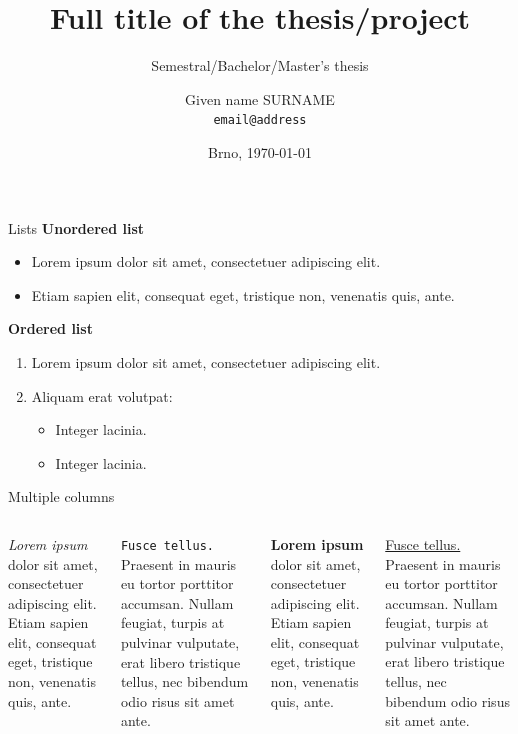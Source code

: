 \documentclass[aspectratio=1610]{beamer}
\title[Short title]
{Full title of the thesis/project}
\subtitle
{Semestral/Bachelor/Master's thesis}
\author[Given name SURNAME]
{Given name SURNAME\\
\texttt{email@address}}
\institute
{Department of Radio Electronics\\
Brno University of Technology, Czechia}
\date[\today]
{Brno, \today}
\begin{document}

\begin{frame}
    \titlepage
\end{frame}


\begin{frame}{Lists}
    \textbf{Unordered list}
    \begin{itemize}
        \item Lorem ipsum dolor sit amet, consectetuer adipiscing elit.

        \item Etiam sapien elit, consequat eget, tristique non, venenatis quis, ante.
    \end{itemize}
    \bigskip

    \textbf{Ordered list}
    \begin{enumerate}
        \item \alert{Lorem ipsum dolor} sit amet, consectetuer adipiscing elit.

        \item Aliquam erat volutpat:
        \begin{itemize}
            \item Integer lacinia.

            \item Integer lacinia.
        \end{itemize}
    \end{enumerate}
\end{frame}



\begin{frame}{Multiple columns}
    \begin{columns}
        \textit{Lorem ipsum} dolor sit amet, consectetuer adipiscing elit. Etiam sapien elit, consequat eget, tristique non, venenatis quis, ante.
        \bigskip
        
        \texttt{Fusce tellus.} Praesent in mauris eu tortor porttitor accumsan. Nullam feugiat, turpis at pulvinar vulputate, erat libero tristique tellus, nec bibendum odio risus sit amet ante.

        \textbf{Lorem ipsum} dolor sit amet, consectetuer adipiscing elit. Etiam sapien elit, consequat eget, tristique non, venenatis quis, ante.
        \bigskip
        
        \underline{Fusce tellus.} Praesent in mauris eu tortor porttitor accumsan. Nullam feugiat, turpis at pulvinar vulputate, erat libero tristique tellus, nec bibendum odio risus sit amet ante.
    \end{columns}
\end{frame}
\end{document}

